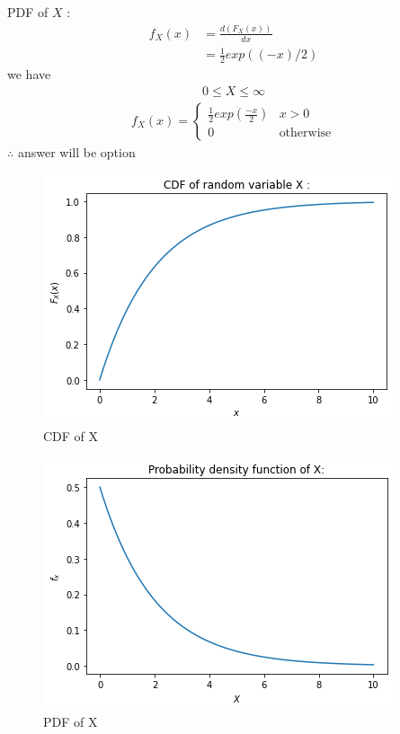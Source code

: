 \documentclass[journal,12pt,twocolumn]{IEEEtran}
\begin{document}
PDF of $X$ : 
\begin{align}
    f_X(x) & = \frac{d (F_X (x)) }{dx} \\
           & = \frac{1}{2}  exp((-x)/2)
\end{align}
 we have     
\begin{align}
    0 \leq X \leq \infty
\end{align}
\begin{align}
    f_X(x) =
    \begin{cases}
    \frac{1}{2}  exp(\frac{-x}{2}) & x > 0 \\
    0 & \text{otherwise}
    \end{cases}
\end{align}
$\therefore$ answer will be option 
\begin{figure}[h]
\begin{center}
    \includegraphics[width = \linewidth]{figure2.png}
    \caption{CDF of X}
    \label{fig:2}
\end{center}
\end{figure}
\begin{figure}[h]
    \includegraphics[width = \linewidth]{figure3.png}
    \caption{PDF of X}
    \label{fig:3}
\end{figure}
\end{document}
